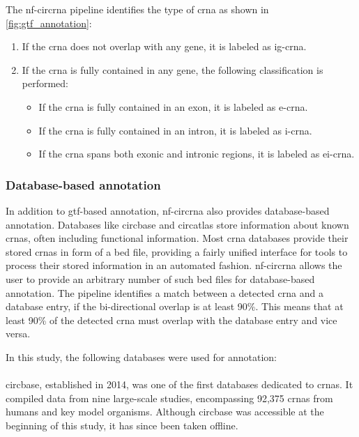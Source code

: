 The \gls{nf-circrna} pipeline identifies the type of \gls{crna} as shown in
\cref{fig:gtf_annotation}: \begin{enumerate} \item If the \gls{crna} does not
            overlap with any gene, it is labeled as \gls{ig-crna}.
      \item If the \gls{crna} is fully contained in any gene, the following
            classification is performed:
            \begin{itemize}
                  \item If the \gls{crna} is fully contained in an exon, it is
                        labeled as \gls{e-crna}.
                  \item If the \gls{crna} is fully contained in an intron, it
                        is
                        labeled as \gls{i-crna}.
                  \item If the \gls{crna} spans both exonic and intronic
                        regions,
                        it is labeled as \gls{ei-crna}.
            \end{itemize}
\end{enumerate}

\subsubsection{Database-based annotation}
\label{sec:database_annotation}
In addition to \gls{gtf}-based annotation, \gls{nf-circrna} also provides
database-based annotation.
Databases like \gls{circbase} and \gls{circatlas} store information about known
\glspl{crna}, often including functional
information\supercite{glazar_circbase_2014,wu_circatlas_2023}.
Most \gls{crna} databases provide their stored \glspl{crna} in form of a
\gls{bed} file, providing a fairly unified interface for tools to process their
stored information in an automated fashion.
\gls{nf-circrna} allows the user to provide an arbitrary number of such
\gls{bed}
files for database-based annotation.
The pipeline identifies a match between a detected \gls{crna} and a database
entry, if the bi-directional overlap is at least 90\%.
This means that at least 90\% of the detected \gls{crna} must overlap with the
database entry and vice versa.

In this study, the following databases were used for annotation:

\paragraph{} \gls{circbase}, established in 2014, was one of the first
databases dedicated to \glspl{crna}.
It compiled data from nine large-scale studies, encompassing 92,375
\glspl{crna} from humans and key model
organisms\supercite{glazar_circbase_2014}.
Although \gls{circbase} was accessible at the beginning of this study, it has since
been taken offline.

